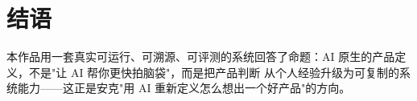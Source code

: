 \section{结语}
本作品用一套真实可运行、可溯源、可评测的系统回答了命题：AI 原生的产品定义，不是"让 AI 帮你更快拍脑袋"，而是把产品判断
从个人经验升级为可复制的系统能力——这正是安克"用 AI 重新定义怎么想出一个好产品"的方向。
